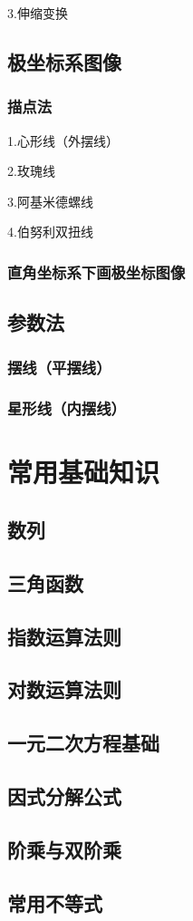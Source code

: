 \documentclass[UTF8]{ctexart}
\begin{document}
3.伸缩变换
\subsection{极坐标系图像}
\subsubsection{描点法}
1.心形线（外摆线）

2.玫瑰线

3.阿基米德螺线

4.伯努利双扭线
\subsubsection{直角坐标系下画极坐标图像}
\subsection{参数法}
\subsubsection{摆线（平摆线）}
\subsubsection{星形线（内摆线）}
\section{常用基础知识}
\subsection{数列}
\subsection{三角函数}
\subsection{指数运算法则}
\subsection{对数运算法则}
\subsection{一元二次方程基础}
\subsection{因式分解公式}
\subsection{阶乘与双阶乘}
\subsection{常用不等式}
\end{document}
